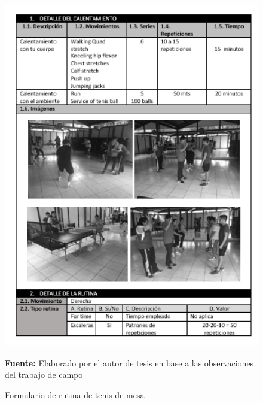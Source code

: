 \begin{figure}[H]
	\caption{Formulario de rutina de tenis de mesa}
	\label{fig:frmRoutTen}
	\centering	\includegraphics[width=445px,height=600px]{graphics/resultados/rutina-tennis.PNG} \\
	\textbf{Fuente:} Elaborado por el autor de tesis en base a las observaciones del trabajo de campo
\end{figure}
